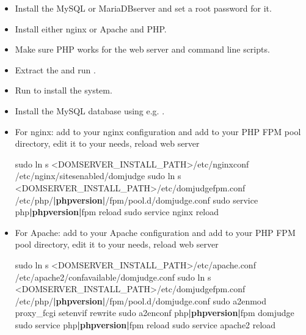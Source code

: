 \documentclass[a4paper,10pt,english,openany]{sphinxmanual}
\begin{document}
\label{\detokenize{quick-install:domserver}}\begin{itemize}
\item {} 
\sphinxAtStartPar
Install the MySQL\sphinxhyphen{} or MariaDB\sphinxhyphen{}server and set a root password for it.

\item {} 
\sphinxAtStartPar
Install either nginx or Apache and PHP.

\item {} 
\sphinxAtStartPar
Make sure PHP works for the web server and command line scripts.

\item {} 
\sphinxAtStartPar
Extract the  and run
.

\item {} 
\sphinxAtStartPar
Run  to install the system.

\item {} 
\sphinxAtStartPar
Install the MySQL database using e.g.
.

\item {} 
\sphinxAtStartPar
For nginx: add  to your nginx configuration and
add  to your PHP FPM pool directory, edit
it to your needs, reload web server
\begin{sphinxalltt}
sudo ln \sphinxhyphen{}s \textless{}DOMSERVER\_INSTALL\_PATH\textgreater{}/etc/nginx\sphinxhyphen{}conf /etc/nginx/sites\sphinxhyphen{}enabled/domjudge
sudo ln \sphinxhyphen{}s \textless{}DOMSERVER\_INSTALL\_PATH\textgreater{}/etc/domjudge\sphinxhyphen{}fpm.conf /etc/php/{\color{red}\bfseries{}|phpversion|}/fpm/pool.d/domjudge.conf
sudo service php{\color{red}\bfseries{}|phpversion|}\sphinxhyphen{}fpm reload
sudo service nginx reload
\end{sphinxalltt}

\item {} 
\sphinxAtStartPar
For Apache: add  to your Apache configuration and
add  to your PHP FPM pool directory, edit
it to your needs, reload web server
\begin{sphinxalltt}
sudo ln \sphinxhyphen{}s \textless{}DOMSERVER\_INSTALL\_PATH\textgreater{}/etc/apache.conf /etc/apache2/conf\sphinxhyphen{}available/domjudge.conf
sudo ln \sphinxhyphen{}s \textless{}DOMSERVER\_INSTALL\_PATH\textgreater{}/etc/domjudge\sphinxhyphen{}fpm.conf /etc/php/{\color{red}\bfseries{}|phpversion|}/fpm/pool.d/domjudge.conf
sudo a2enmod proxy\_fcgi setenvif rewrite
sudo a2enconf php{\color{red}\bfseries{}|phpversion|}\sphinxhyphen{}fpm domjudge
sudo service php{\color{red}\bfseries{}|phpversion|}\sphinxhyphen{}fpm reload
sudo service apache2 reload
\end{sphinxalltt}


\end{itemize}
\end{document}
